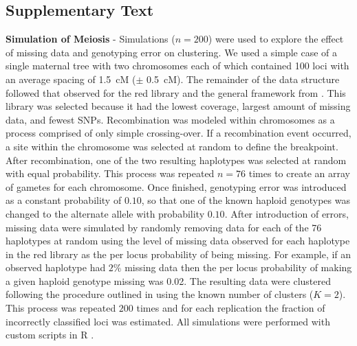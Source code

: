 \documentclass[11pt]{article}
\begin{document}
\subsection*{Supplementary Text}\label{ss:supp}

\textbf{Simulation of Meiosis} - Simulations ($n = 200$) were used to explore 
the effect of missing data and genotyping error on clustering. We 
used a simple case of a single maternal tree with two chromosomes each of which contained 100 loci
with an average spacing of \SI{1.5}{cM} ($\pm$ \SI{0.5}{cM}).
The remainder of the data structure followed that observed for the red library and the general framework from \citet{Hackett:2003}. This library was selected
because it had the lowest coverage, largest amount of missing data, and fewest SNPs.
Recombination was modeled within chromosomes as a process comprised of only simple crossing-over. If a recombination event occurred, a site within the chromosome
was selected at random to define the breakpoint. After recombination, one of the two resulting haplotypes was
selected at random with equal probability. This process was repeated $n = 76$ times to create
an array of gametes for each chromosome. Once finished, genotyping error was introduced as a constant
probability of $0.10$, so that one of the known haploid genotypes was changed to the alternate allele with probability $0.10$. 
After introduction of errors, missing data were simulated by randomly removing data for each
of the 76 haplotypes at random using the level of missing data observed for each haplotype in the red library
as the per locus probability of being missing. For example, if an observed haplotype had $2\%$ missing data
then the per locus probability of making a given haploid genotype missing was 0.02. The resulting data were
clustered following the procedure outlined in  using the known number of clusters ($K = 2$).
This process was repeated $200$ times and for each replication the fraction of incorrectly classified loci was
estimated. All simulations were performed with custom scripts in R \citep{R:2013}.
\end{document}
